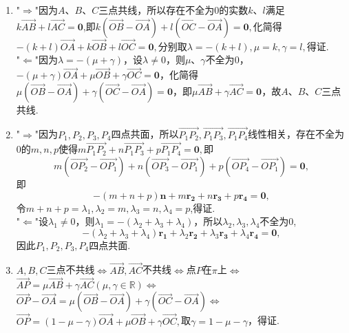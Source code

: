 \documentclass[UTF8]{ctexart}
\begin{document}
\begin{enumerate}
\item "$\Rightarrow$"因为$A$、$B$、$C$三点共线，所以存在不全为$0$的实数$k$、$l$满足$k\overrightarrow{AB}+l\overrightarrow{AC}=\mathbf{0}$,即$k\left(\overrightarrow{OB}-\overrightarrow{OA}\right)+l\left(\overrightarrow{OC}-\overrightarrow{OA}\right)=\mathbf{0},$化简得$-\left(k+l\right)\overrightarrow{OA}+k\overrightarrow{OB}+l\overrightarrow{OC}=\mathbf{0},$分别取$\lambda=-\left(k+l\right),\mu=k,\gamma=l,$得证.\\
"$\Leftarrow$"因为$\lambda=-\left(\mu+\gamma\right)$，设$\lambda\neq0$，则$\mu$、$\gamma$不全为$0$，$-\left(\mu+\gamma\right)\overrightarrow{OA}+\mu\overrightarrow{OB}+\gamma\overrightarrow{OC}=\mathbf{0}$，化简得$\mu\left(\overrightarrow{OB}-\overrightarrow{OA}\right)+\gamma\left(\overrightarrow{OC}-\overrightarrow{OA}\right)=\mathbf{0}$，即$\mu\overrightarrow{AB}+\gamma\overrightarrow{AC}=\mathbf{0}$，故$A$、$B$、$C$三点共线. 

\item "$\Rightarrow$"因为$P_1,P_2,P_3,P_4$四点共面，所以$\overrightarrow{P_{1}P_{2}},\overrightarrow{P_{1}P_{3}},\overrightarrow{P_{1}P_{4}}$线性相关，存在不全为$0$的$m,n,p$使得$m\overrightarrow{P_{1}P_{2}}+n\overrightarrow{P_{1}P_{3}}+p\overrightarrow{P_{1}P_{4}}=\mathbf{0},$即$$m\left(\overrightarrow{OP_2}-\overrightarrow{OP_1}\right)+n\left(\overrightarrow{OP_3}-\overrightarrow{OP_1}\right)+p\left(\overrightarrow{OP_4}-\overrightarrow{OP_1}\right)=\mathbf{0},$$即$$-\left(m+n+p\right)\mathbf{n}+m\mathbf{r_2}+n\mathbf{r_3}+p\mathbf{r_4}=\mathbf{0},$$令$m+n+p=\lambda_1,\lambda_2=m,\lambda_3=n,\lambda_4=p$,得证. \\
"$\Leftarrow$"设$\lambda_1\neq0$，则$\lambda_1=-\left(\lambda_2+\lambda_3+\lambda_4\right)$，所以$\lambda_2,\lambda_3,\lambda_4$不全为$0$,$$-\left(\lambda_2+\lambda_3+\lambda_4\right)\mathbf{r_1}+\lambda_2\mathbf{r_2}+\lambda_3\mathbf{r_3}+\lambda_4\mathbf{r_4}=\mathbf{0},$$因此$P_1,P_2,P_3,P_4$四点共面. 

\item $A,B,C$三点不共线$\Leftrightarrow$$\overrightarrow{AB},\overrightarrow{AC}$不共线$\Leftrightarrow$点$P$在$\pi$上$\Leftrightarrow$$\overrightarrow{AP}=\mu\overrightarrow{AB}+\gamma\overrightarrow{AC}\left(\mu,\gamma\in \mathbb{R}\right)$$\Leftrightarrow$$\overrightarrow{OP}-\overrightarrow{OA}=\mu\left(\overrightarrow{OB}-\overrightarrow{OA}\right)+\gamma\left(\overrightarrow{OC}-\overrightarrow{OA}\right)$$\Leftrightarrow$$\overrightarrow{OP}=\left(1-\mu-\gamma\right)\overrightarrow{OA}+\mu\overrightarrow{OB}+\gamma\overrightarrow{OC},$取$\gamma=1-\mu-\gamma$，得证. 


\end{enumerate}
\end{document}

